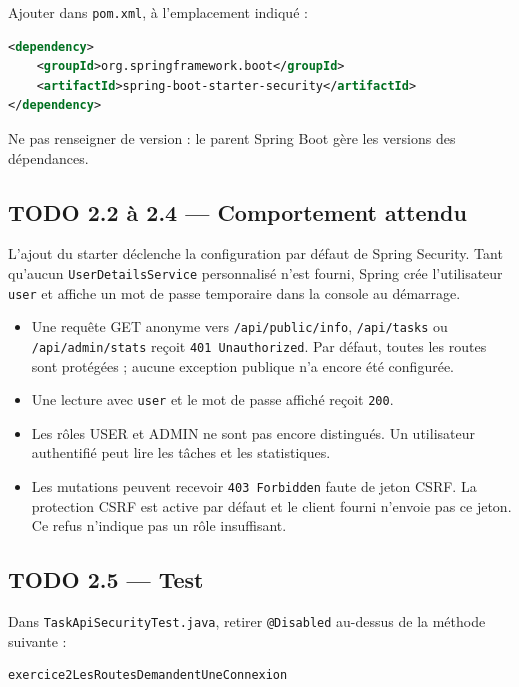 \documentclass[11pt,a4paper]{article}
\begin{document}
Ajouter dans \texttt{pom.xml}, à l’emplacement indiqué :

\begin{lstlisting}[language=XML]
<dependency>
    <groupId>org.springframework.boot</groupId>
    <artifactId>spring-boot-starter-security</artifactId>
</dependency>
\end{lstlisting}

Ne pas renseigner de version : le parent Spring Boot gère les versions des dépendances.

\subsection{TODO 2.2 à 2.4 — Comportement attendu}

L’ajout du starter déclenche la configuration par défaut de Spring Security. Tant qu’aucun \texttt{UserDetailsService} personnalisé n’est fourni, Spring crée l’utilisateur \texttt{user} et affiche un mot de passe temporaire dans la console au démarrage.

\begin{itemize}
\item Une requête GET anonyme vers \texttt{/api/public/info}, \texttt{/api/tasks} ou \texttt{/api/admin/stats} reçoit \texttt{401 Unauthorized}. Par défaut, toutes les routes sont protégées ; aucune exception publique n’a encore été configurée.
\item Une lecture avec \texttt{user} et le mot de passe affiché reçoit \texttt{200}.
\item Les rôles USER et ADMIN ne sont pas encore distingués. Un utilisateur authentifié peut lire les tâches et les statistiques.
\item Les mutations peuvent recevoir \texttt{403 Forbidden} faute de jeton CSRF. La protection CSRF est active par défaut et le client fourni n’envoie pas ce jeton. Ce refus n’indique pas un rôle insuffisant.
\end{itemize}

\subsection{TODO 2.5 — Test}

Dans \texttt{TaskApiSecurityTest.java}, retirer \texttt{@Disabled} au-dessus de la méthode suivante :

\begin{lstlisting}
exercice2LesRoutesDemandentUneConnexion
\end{lstlisting}
\end{document}
